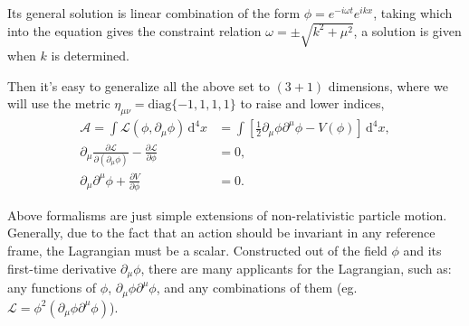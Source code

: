 \documentclass{article}
\newcommand{\be}{\begin{equation}}
\newcommand{\ee}{\end{equation}}
\newcommand{\dif}{\,\mathrm{d}}
\newcommand{\p}{\partial}
\newcommand{\1}{\left}
\newcommand{\2}{\right}
\newcommand{\ma}{\mathcal}
\newcommand{\m}{\mu}
\newcommand{\n}{\nu}
\begin{document}
Its general solution is linear combination of the form $\phi=e^{-i \omega t} e^{i k x}$, taking which into the equation gives the constraint relation $\omega=\pm\sqrt{k^2+\mu^2}$, a solution is given when $k$ is determined.

Then it's easy to generalize all the above set to $(3+1)$ dimensions, where we will use the metric $\eta_{\m\n} = \text{diag}\{-1,1,1,1\}$ to raise and lower indices, 
\be
\begin{split}
\ma A = \int \ma L(\phi, \p_\mu \phi) \dif^4 x &= \int \1[\frac1 2 \p_\mu\phi \p^\mu \phi - V(\phi)\2] \dif^4 x,\\
\p_\mu \frac{\p \ma L}{\p (\p_\mu \phi)} - \frac{\p\ma L}{\p \phi} &= 0,\\
\p_\mu\p^\mu \phi+ \frac{\p V}{\p \phi} &= 0.
\end{split}
\ee

Above formalisms are just simple extensions of non-relativistic particle motion. 
Generally, due to the fact that an action should be invariant in any reference frame, the Lagrangian must be a scalar. Constructed out of the field $\phi$ and its first-time derivative $\p_\mu \phi$, there are many applicants for the Lagrangian, such as: any functions of $\phi$, $\p_\mu\phi \p^\mu \phi$, and any combinations of them (eg. $\ma L = \phi^2 (\p_\mu\phi \p^\mu \phi)$).
\end{document}
